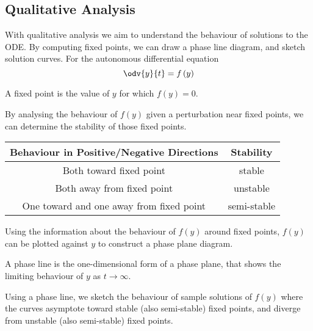 \documentclass{article}
\begin{document}
\subsection{Qualitative Analysis}
With qualitative analysis we aim to understand the behaviour of
solutions to the ODE\@. By \linebreak computing fixed points, we can
draw a phase line diagram, and sketch solution curves. For the
autonomous differential equation
\begin{equation*}
    \odv{y}{t} = f\left( y \right)
\end{equation*}
\begin{definition}
    A fixed point is the value of \(y\) for which \(f\left( y \right) = 0\).
\end{definition}
\begin{definition}[Stability]
    By analysing the behaviour of \(f\left( y \right)\) given a perturbation near
    fixed points, we can determine the stability of those fixed points.
    \begin{table}[H]
        \centering
        \begin{tabular}{c c}
            \toprule
            \textbf{Behaviour in Positive/Negative Directions} & \textbf{Stability} \\
            \midrule
            Both toward fixed point                            & stable             \\
            Both away from fixed point                         & unstable           \\
            One toward and one away from fixed point           & semi-stable        \\
            \bottomrule
        \end{tabular}
    \end{table}
\end{definition}
\begin{definition}
    Using the information about the behaviour of \(f\left( y \right)\) around fixed
    points, \(f\left( y \right)\) can be plotted against \(y\) to construct a phase
    plane diagram.
\end{definition}
\begin{definition}
    A phase line is the one-dimensional form of a phase plane, that
    shows the limiting behaviour of \(y\) as \(t \to \infty\).
\end{definition}
\begin{definition}
    Using a phase line, we sketch the behaviour of sample solutions of
    \(f\left( y \right)\) where the curves asymptote toward stable (also
    semi-stable) fixed points, and diverge from unstable (also
    semi-stable) fixed points.
\end{definition}
\newpage
\end{document}
